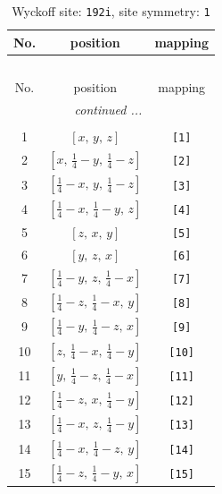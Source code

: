 \documentclass[fleqn,8pt]{jsarticle}
\begin{document}
\begin{longtable}{ccc}
\caption{Wyckoff site: {\tt 192i}, site symmetry: {\tt 1}}
 \\
 \hline \hline
No. & position & mapping \\ \hline \endfirsthead

\multicolumn{2}{l}{\tablename\ \thetable{}} \\
 \hline \hline
No. & position & mapping \\ \hline \endhead

 \hline \hline
\multicolumn{2}{r}{\footnotesize\it continued ...} \\ \endfoot

 \hline \hline
\multicolumn{2}{r}{} \\ \endlastfoot

1 & $\left[ x,\, y,\, z \right]$ & {\tt [1]} \\ \hline
2 & $\left[ x,\, \frac{1}{4} - y,\, \frac{1}{4} - z \right]$ & {\tt [2]} \\ \hline
3 & $\left[ \frac{1}{4} - x,\, y,\, \frac{1}{4} - z \right]$ & {\tt [3]} \\ \hline
4 & $\left[ \frac{1}{4} - x,\, \frac{1}{4} - y,\, z \right]$ & {\tt [4]} \\ \hline
5 & $\left[ z,\, x,\, y \right]$ & {\tt [5]} \\ \hline
6 & $\left[ y,\, z,\, x \right]$ & {\tt [6]} \\ \hline
7 & $\left[ \frac{1}{4} - y,\, z,\, \frac{1}{4} - x \right]$ & {\tt [7]} \\ \hline
8 & $\left[ \frac{1}{4} - z,\, \frac{1}{4} - x,\, y \right]$ & {\tt [8]} \\ \hline
9 & $\left[ \frac{1}{4} - y,\, \frac{1}{4} - z,\, x \right]$ & {\tt [9]} \\ \hline
10 & $\left[ z,\, \frac{1}{4} - x,\, \frac{1}{4} - y \right]$ & {\tt [10]} \\ \hline
11 & $\left[ y,\, \frac{1}{4} - z,\, \frac{1}{4} - x \right]$ & {\tt [11]} \\ \hline
12 & $\left[ \frac{1}{4} - z,\, x,\, \frac{1}{4} - y \right]$ & {\tt [12]} \\ \hline
13 & $\left[ \frac{1}{4} - x,\, z,\, \frac{1}{4} - y \right]$ & {\tt [13]} \\ \hline
14 & $\left[ \frac{1}{4} - x,\, \frac{1}{4} - z,\, y \right]$ & {\tt [14]} \\ \hline
15 & $\left[ \frac{1}{4} - z,\, \frac{1}{4} - y,\, x \right]$ & {\tt [15]} \\ \hline

\end{longtable}
\end{document}
